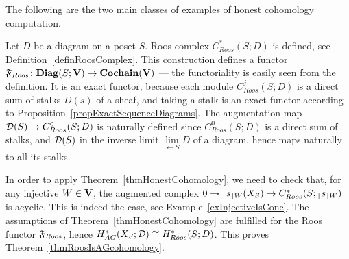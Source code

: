 The following are the two main classes of examples of honest cohomology computation.

\begin{ex}\label{exRoos}
Let $D$ be a diagram on a poset $S$. Roos complex $C^*_{Roos}(S;D)$ is defined, see Definition~\ref{definRoosComplex}. This construction defines a functor $\mathfrak{F}_{Roos}\colon \mathbf{Diag}(S;\mathbf{V})\to \mathbf{Cochain}(\mathbf{V})$ --- the functoriality is easily seen from the definition. It is an exact functor, because each module $C^j_{Roos}(S;D)$ is a direct sum of stalks $D(s)$ of a sheaf, and taking a stalk is an exact functor according to Proposition~\ref{propExactSequenceDiagrams}. The augmentation map $\mathcal{D}(S)\to C^0_{Roos}(S;D)$ is naturally defined since $C^0_{Roos}(S;D)$ is a direct sum of stalks, and $\mathcal{D}(S)$ in the inverse limit $\lim\limits_{\leftarrow S}D$ of a diagram, hence maps naturally to all its stalks.

In order to apply Theorem~\ref{thmHonestCohomology}, we need to check that, for any injective $W\in\mathbf{V}$, the augmented complex $0\to{_{\lceil}s_{\rceil W}}(X_S)\to C^*_{Roos}(S;{_{\lceil}s_{\rceil W}})$ is acyclic. This is indeed the case, see Example~\ref{exInjectiveIsCone}. The assumptions of Theorem~\ref{thmHonestCohomology} are fulfilled for the Roos functor $\mathfrak{F}_{Roos}$, hence $H^*_{AG}(X_S;\mathcal{D})\cong H_{Roos}^*(S;D)$. This proves Theorem~\ref{thmRoosIsAGcohomology}.
\end{ex}

